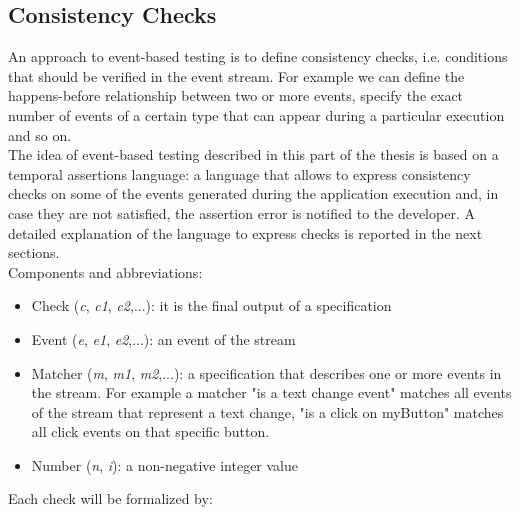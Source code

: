 \documentclass[11pt,a4paper,notitlepage]{article}
\begin{document}
\subsection{Consistency Checks}
An approach to event-based testing is to define consistency checks, i.e. conditions that should be verified in the event stream. For example we can define the happens-before relationship between two or more events, specify the exact number of events of a certain type that can appear during a particular execution and so on.\medskip \\
The idea of event-based testing described in this part of the thesis is based on a temporal assertions language: a language that allows to express consistency checks on some of the events generated during the application execution and, in case they are not satisfied, the assertion error is notified to the developer. A detailed explanation of the language to express checks is reported in the next sections.\bigskip \\
Components and abbreviations:
\begin{itemize}
	\item Check (\textit{c}, \textit{c1}, \textit{c2},...): it is the final output of a specification
	\item Event (\textit{e}, \textit{e1}, \textit{e2},...): an event of the stream
	\item Matcher (\textit{m}, \textit{m1}, \textit{m2},...): a specification that describes one or more events in the stream. For example a matcher "is a text change event" matches all events of the stream that represent a text change, "is a click on myButton" matches all click events on that specific button.
	\item Number (\textit{n}, \textit{i}): a non-negative integer value
\end{itemize}\medskip
Each check will be formalized by:
\end{document}
